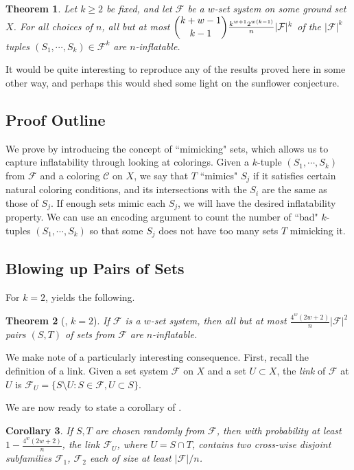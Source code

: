 \documentclass[12pt]{article}
\newtheorem{theorem}{Theorem}[section]
\newtheorem{corollary}[theorem]{Corollary}
\newcommand{\F}{\mathcal{F}}
\newcommand{\C}{\mathcal{C}}
\begin{document}
\begin{theorem}
\label{thm:main}
Let $k \ge 2$ be fixed, and let $\F$ be a $w$-set system on some ground set $X$.  For all choices of $n$, all but at most $\dbinom{k+w-1}{k-1}\frac{k^{w+1}2^{w(k-1)}}{n}|\F|^k$ of the $|\F|^k$ tuples $(S_1, \cdots, S_k) \in \F^k$ are $n$-inflatable.
\end{theorem}

It would be quite interesting to reproduce any of the results proved here in some other way, and perhaps this would shed some light on the sunflower conjecture. 

\subsection{Proof Outline}

We prove  by introducing the concept of ``mimicking" sets, which allows us to capture inflatability through looking at colorings.  Given a $k$-tuple $(S_1, \cdots, S_k)$ from $\F$ and a coloring $\C$ on $X$, we say that $T$ ``mimics" $S_j$ if it satisfies certain natural coloring conditions, and its intersections with the $S_i$ are the same as those of $S_j$. If enough sets mimic each $S_j$, we will have the desired inflatability property.  We can use an encoding argument to count the number of ``bad" $k$-tuples $(S_1, \cdots, S_k)$ so that some $S_j$ does not have too many sets $T$ mimicking it.
	
\subsection{Blowing up Pairs of Sets}

For $k=2$,  yields the following.

\begin{theorem}[, $k=2$]
\label{thm:2set} If $\F$ is a $w$-set system, then all but at most $\frac{4^w(2w+2)}{n}|\F|^2$ pairs $(S, T)$ of sets from $\F$ are $n$-inflatable. \end{theorem}

We make note of a particularly interesting consequence. First, recall the definition of a link. Given a set system $\F$ on $X$ and a set $U \subset X$, the \emph{link} of $\F$ at $U$ is
$\F_U = \{S \setminus U: S \in \F, U \subset S\}.$

We are now ready to state a corollary of .

\begin{corollary}
\label{corollary:bipartite}
If $S, T$ are chosen randomly from $\F$, then with probability at least $1-\frac{4^w(2w+2)}{n}$, the link $\F_U$, where $U=S \cap T$, contains two cross-wise disjoint subfamilies $\F_1$, $\F_2$ each of size at least $|\F|/n$. \end{corollary}
\end{document}
